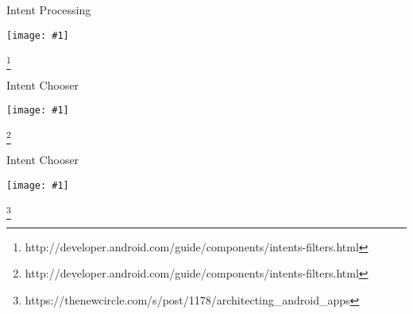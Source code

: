 \documentclass[14pt]{beamer}
\newcommand{\screen}[1]{
  \setlength{\leftmargin}{0pt}
  \setlength{\rightmargin}{0pt}
  \begin{center}
    \texttt{[image: \#1]}
  \end{center}
}
\newcommand{\footer}[1]{
  \begingroup
  \renewcommand\thefootnote{}\footnote{#1}
  \addtocounter{footnote}{-1}
  \endgroup
}
\begin{document}
\begin{frame}{Intent Processing}
  \screen{../images/intent-filters.png}
  \footer{http://developer.android.com/guide/components/intents-filters.html}
\end{frame}

\begin{frame}{Intent Chooser}
  \screen{../images/intent-chooser.png}
  \footer{http://developer.android.com/guide/components/intents-filters.html}
\end{frame}

\begin{frame}{Intent Chooser}
  \screen{../images/yamba.pdf}
  \footer{https://thenewcircle.com/s/post/1178/architecting\_android\_apps}
\end{frame}
\end{document}
